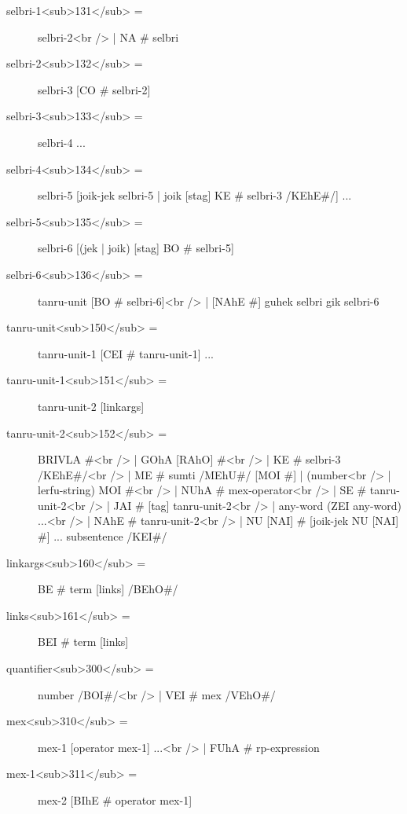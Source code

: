 \begin{description}
\item[selbri-1<sub>131</sub> =] selbri-2<br /> | NA # selbri \label{html:b132}
\hyperref[html:y132]{}
\item[selbri-2<sub>132</sub> =] selbri-3 [CO # selbri-2] \label{html:b133}
\hyperref[html:y133]{}
\item[selbri-3<sub>133</sub> =] selbri-4 ... \label{html:b134}
\hyperref[html:y134]{}
\item[selbri-4<sub>134</sub> =] selbri-5 [joik-jek selbri-5 | joik [stag] KE # selbri-3 /KEhE#/] ... \label{html:b135}
\hyperref[html:y135]{}
\item[selbri-5<sub>135</sub> =] selbri-6 [(jek | joik) [stag] BO # selbri-5] \label{html:b136}
\hyperref[html:y136]{}
\item[selbri-6<sub>136</sub> =] tanru-unit [BO # selbri-6]<br /> | [NAhE #] guhek selbri gik selbri-6 \label{html:b150}
\hyperref[html:y150]{}
\item[tanru-unit<sub>150</sub> =] tanru-unit-1 [CEI # tanru-unit-1] ... \label{html:b151}
\hyperref[html:y151]{}
\item[tanru-unit-1<sub>151</sub> =] tanru-unit-2 [linkargs] \label{html:b152}
\hyperref[html:y152]{}
\item[tanru-unit-2<sub>152</sub> =] BRIVLA #<br /> | GOhA [RAhO] #<br /> | KE # selbri-3 /KEhE#/<br /> | ME # sumti /MEhU#/ [MOI #] | (number<br /> | lerfu-string) MOI #<br /> | NUhA # mex-operator<br /> | SE # tanru-unit-2<br /> | JAI # [tag] tanru-unit-2<br /> | any-word (ZEI any-word) ...<br /> | NAhE # tanru-unit-2<br /> | NU [NAI] # [joik-jek NU [NAI] #] ... subsentence /KEI#/ \label{html:b160}
\hyperref[html:y160]{}
\item[linkargs<sub>160</sub> =] BE # term [links] /BEhO#/ \label{html:b161}
\hyperref[html:y161]{}
\item[links<sub>161</sub> =] BEI # term [links] \label{html:b300}
\hyperref[html:y300]{}
\item[quantifier<sub>300</sub> =] number /BOI#/<br /> | VEI # mex /VEhO#/ \label{html:b310}
\hyperref[html:y310]{}
\item[mex<sub>310</sub> =] mex-1 [operator mex-1] ...<br /> | FUhA # rp-expression \label{html:b311}
\hyperref[html:y311]{}
\item[mex-1<sub>311</sub> =] mex-2 [BIhE # operator mex-1] \label{html:b312}

\end{description}
